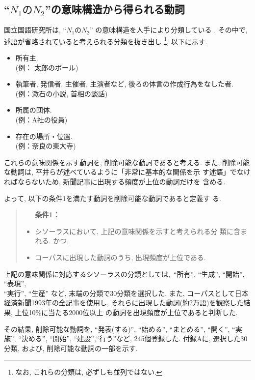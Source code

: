 \subsection{``$N_1のN_2$''の意味構造から得られる動詞}\label{byruigo}
国立国語研究所は, ``$N_1のN_2$'' の意味構造を人手により分類している
\cite{kokugo51}. 
その中で, 述語が省略されていると考えられる分類を抜き出し
\footnote{なお, これらの分類は, 必ずしも並列ではない. }, 以下に示す. 
\begin{itemize}
\item 所有主. \\
      (例： 太郎のボール)
\item 執筆者, 発信者, 主催者, 主演者など, 後ろの体言の作成行為をなした者.\\
       (例：漱石の小説, 首相の談話)
\item 所属の団体. \\
      (例：A社の役員)
\item 存在の場所・位置. \\
      (例：奈良の東大寺)
\end{itemize}

これらの意味関係を示す動詞を, 削除可能な動詞であると考える. 
また, 削除可能な動詞は, 平井らが述べているように「非常に基本的な関係を示
す述語」でなければならないため, 新聞記事に出現する頻度が上位の動詞だけを
含める. 

よって, 以下の条件1を満たす動詞を削除可能な動詞であると定義す
る. 
\begin{quote}
\begin{itemize}
\item[{\bf 条件1：}]
\item シソーラス\cite{k_ruigo}において, 上記の意味関係を示すと考えられる分
      類に含まれる. かつ, 
\item コーパスに出現した動詞のうち, 出現頻度が上位である.
\end{itemize}
\end{quote}

上記の意味関係に対応するシソーラスの分類としては,\ 
``所有'', ``生成'', ``開始'', ``表現'',\\ ``実行'', ``生産'' など, 
末端の分類で30分類を選択した. 
また, 
コーパスとして日本経済新聞1993年の全記事を使用し,
それらに出現した動詞(約2万語)を観察した結果, 上位10\%に当たる2000位以上
の動詞を出現頻度が上位であると判断した.

その結果, 削除可能な動詞を, ``発表(する)'', ``始める'', ``まとめる'', 
``開く'', ``実施'', ``決める'', ``開始'', ``建設'',``行う''など, 
245個登録した. 
付録Aに, 選択した30分類, および, 削除可能な動詞の一部を示す.

